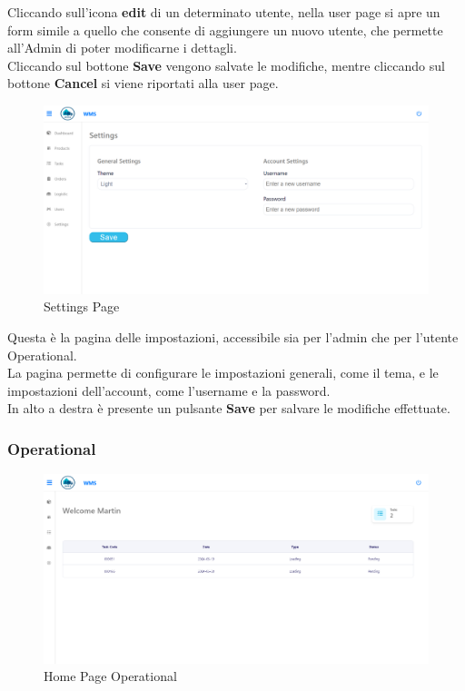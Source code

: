 Cliccando sull'icona \textbf{edit} di un determinato utente, nella user page si apre un form simile a quello che
consente di aggiungere un nuovo utente, che permette all'Admin di poter modificarne i dettagli.\\
Cliccando sul bottone \textbf{Save} vengono salvate le modifiche, mentre cliccando sul bottone \textbf{Cancel} si viene
riportati alla user page.

\begin{figure}[H]
    \centering
    \includegraphics[width=\textwidth]{document/sections/img/Storyboard/settingsPage.png}
    \caption{Settings Page}
    \label{fig:settingsPage}
\end{figure}

Questa è la pagina delle impostazioni, accessibile sia per l'admin che per l'utente Operational.\\
La pagina permette di configurare le impostazioni generali, come il tema, e le impostazioni dell'account, come l'username e la password.\\
In alto a destra è presente un pulsante \textbf{Save} per salvare le modifiche effettuate.

\subsubsection{Operational}

\begin{figure}[H]
    \centering
    \includegraphics[width=\textwidth]{document/sections/img/Storyboard/homePageOp.png}
        \caption{Home Page Operational}
    \label{fig:homePageOp}
\end{figure}

